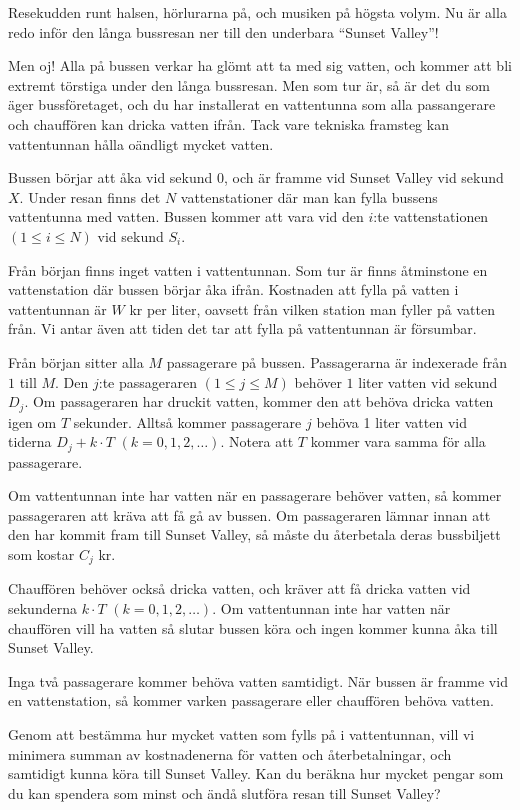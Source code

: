 \noindent
Resekudden runt halsen, hörlurarna på, och musiken på högsta volym. 
Nu är alla redo inför den långa bussresan ner till den underbara ``Sunset Valley''!

Men oj! Alla på bussen verkar ha glömt att ta med sig vatten, 
och kommer att bli extremt törstiga under den långa bussresan.
Men som tur är, så är det du som äger bussföretaget, 
och du har installerat en vattentunna som alla passangerare och chauffören kan dricka vatten ifrån.
Tack vare tekniska framsteg kan vattentunnan hålla oändligt mycket vatten.

Bussen börjar att åka vid sekund $0$, och är framme vid Sunset Valley vid sekund $X$.
Under resan finns det $N$ vattenstationer där man kan fylla bussens vattentunna med vatten. 
Bussen kommer att vara vid den $i$:te vattenstationen $(1 \leq i \leq N)$ vid sekund $S_i$.

Från början finns inget vatten i vattentunnan. Som tur är finns åtminstone en vattenstation där bussen börjar åka ifrån.
Kostnaden att fylla på vatten i vattentunnan är $W$ kr per liter, oavsett från vilken station man fyller på vatten från.
Vi antar även att tiden det tar att fylla på vattentunnan är försumbar.

Från början sitter alla $M$ passagerare på bussen. Passagerarna är indexerade från $1$ till $M$.
Den $j$:te passageraren $(1 \leq j \leq M)$ behöver $1$ liter vatten vid sekund $D_j$. 
Om passageraren har druckit vatten, kommer den att behöva dricka vatten igen om $T$ sekunder. 
Alltså kommer passagerare $j$ behöva 1 liter vatten vid tiderna $D_j + k\cdot T$ $(k = 0,1,2,\ldots)$.
Notera att $T$ kommer vara samma för alla passagerare.

Om vattentunnan inte har vatten när en passagerare behöver vatten, så kommer passageraren att kräva att få gå av bussen.
Om passageraren lämnar innan att den har kommit fram till Sunset Valley, så måste du återbetala deras bussbiljett
som kostar $C_j$ kr.

Chauffören behöver också dricka vatten, och kräver att få dricka vatten vid sekunderna $k\cdot T$ $(k = 0,1,2,\ldots)$. 
Om vattentunnan inte har vatten när chauffören vill ha vatten så slutar bussen köra och ingen kommer kunna åka till Sunset Valley.

Inga två passagerare kommer behöva vatten samtidigt. När bussen är framme vid en vattenstation, så kommer varken passagerare eller chauffören behöva vatten.

Genom att bestämma hur mycket vatten som fylls på i vattentunnan, vill vi minimera summan av kostnadenerna för
vatten och återbetalningar, och samtidigt kunna köra till Sunset Valley. Kan du beräkna hur mycket pengar som du
kan spendera som minst och ändå slutföra resan till Sunset Valley?

